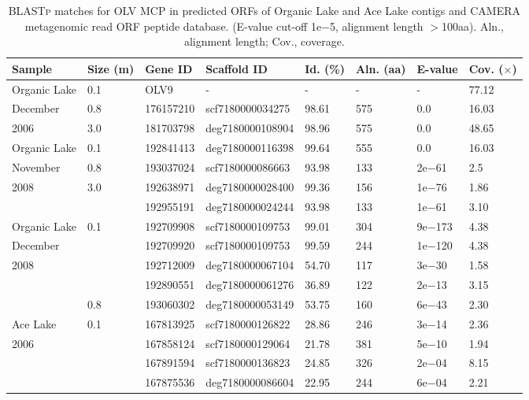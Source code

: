 \begingroup
\begin{table}
\footnotesize
\caption[\acs{OLV} \acs{MCP} in Organic Lake and Ace Lake  and \ac{CAMERA}]{ \textsc{BLASTp} matches for \ac{OLV} \ac{MCP} in predicted \acp{ORF} of Organic Lake and Ace Lake contigs and \ac{CAMERA} metagenomic read \ac{ORF} peptide database. (E-value cut-off 1e$-$5, alignment length $>$100aa). Aln., alignment length; Cov., coverage.}
\label{tab:olv_mcp_blastp}
\smallskip
\begin{tabularx}{\textwidth}{p{2.5cm}p{0.5cm}p{3.5cm}Xp{0.5cm}p{0.5cm}p{0.8cm}p{0.5cm}}
\toprule
\textbf{Sample} & \textbf{Size (\textmu{}m)} & \textbf{Gene ID} & \textbf{Scaffold ID} & \textbf{Id. (\%)} & \textbf{Aln. (aa)} & \textbf{E-value} & \textbf{Cov. ($\times$)} \\
\midrule
Organic Lake & 0.1 & OLV9 & - & - & - & - & 77.12 \\
December & 0.8 & 176157210 & scf7180000034275 & 98.61 & 575 & 0.0 & 16.03 \\
2006 & 3.0 & 181703798 & deg7180000108904 & 98.96 & 575 & 0.0 & 48.65 \\

Organic Lake & 0.1 & 192841413 & deg7180000116398 & 99.64 & 555 & 0.0 & 16.03 \\
November & 0.8 & 193037024 & scf7180000086663 & 93.98 & 133 & 2e$-$61 & 2.5 \\
2008 & 3.0 & 192638971 & deg7180000028400 & 99.36 & 156 & 1e$-$76 & 1.86 \\
 &  & 192955191 & deg7180000024244 & 93.98 & 133 & 1e$-$61 & 3.10 \\

Organic Lake & 0.1 & 192709908 & scf7180000109753 & 99.01 & 304 & 9e$-$173 & 4.38 \\
December &  & 192709920 & scf7180000109753 & 99.59 & 244 & 1e$-$120 & 4.38 \\
2008 &  & 192712009 & deg7180000067104 & 54.70 & 117 & 3e$-$30 & 1.58 \\
 &  & 192890551 & deg7180000061276 & 36.89 & 122 & 2e$-$13 & 3.15 \\
 & 0.8 & 193060302 & deg7180000053149 & 53.75 & 160 & 6e$-$43 & 2.30 \\

Ace Lake & 0.1 & 167813925 & scf7180000126822 & 28.86 & 246 & 3e$-$14 & 2.36  \\
2006 &  & 167858124 & scf7180000129064 & 21.78 & 381 & 5e$-$10 & 1.94 \\
 &  & 167891594 & scf7180000136823 & 24.85 & 326 & 2e$-$04 & 8.15 \\
 &  & 167875536 & deg7180000086604 & 22.95 & 244 & 6e$-$04 & 2.21 \\


\end{tabularx}
\end{table}
